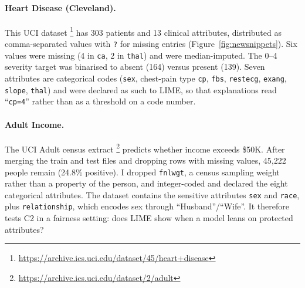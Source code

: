 \documentclass[11pt]{article}
\newcommand{\tok}[1]{\texttt{#1}}
\begin{document}
\paragraph{Heart Disease (Cleveland).} This UCI dataset \citep{detrano1989international}\footnote{\url{https://archive.ics.uci.edu/dataset/45/heart+disease}} has 303 patients and 13 clinical attributes, distributed as comma-separated values with \tok{?} for missing entries (Figure~\ref{fig:newsnippets}). Six values were missing (4 in \tok{ca}, 2 in \tok{thal}) and were median-imputed. The 0--4 severity target was binarised to absent (164) versus present (139). Seven attributes are categorical codes (\tok{sex}, chest-pain type \tok{cp}, \tok{fbs}, \tok{restecg}, \tok{exang}, \tok{slope}, \tok{thal}) and were declared as such to LIME, so that explanations read ``\tok{cp=4}'' rather than as a threshold on a code number.

\paragraph{Adult Income.} The UCI Adult census extract \citep{kohavi1996scaling}\footnote{\url{https://archive.ics.uci.edu/dataset/2/adult}} predicts whether income exceeds \$50K. After merging the train and test files and dropping rows with missing values, 45,222 people remain (24.8\% positive). I dropped \tok{fnlwgt}, a census sampling weight rather than a property of the person, and integer-coded and declared the eight categorical attributes. The dataset contains the sensitive attributes \tok{sex} and \tok{race}, plus \tok{relationship}, which encodes sex through ``Husband''/``Wife''. It therefore tests C2 in a fairness setting: does LIME show when a model leans on protected attributes?
\end{document}

